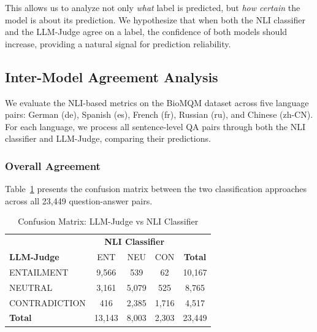     This allows us to analyze not only \textit{what} label is predicted, but \textit{how certain} the model is about its prediction. We hypothesize that when both the NLI classifier and the LLM-Judge agree on a label, the confidence of both models should increase, providing a natural signal for prediction reliability.



    \subsection{Inter-Model Agreement Analysis}
    \label{sec:nli_results}

    We evaluate the NLI-based metrics on the BioMQM dataset across five language pairs: German (de), Spanish (es), French (fr), Russian (ru), and Chinese (zh-CN). For each language, we process all sentence-level QA pairs through both the NLI classifier and LLM-Judge, comparing their predictions.

    \subsubsection{Overall Agreement}

    Table~\ref{tab:confusion_matrix} presents the confusion matrix between the two classification approaches across all 23,449 question-answer pairs.

    \begin{table}[htbp]
    \centering
    \caption{Confusion Matrix: LLM-Judge vs NLI Classifier}
    \label{tab:confusion_matrix}
    \begin{tabular}{l|ccc|c}
    \hline
    & \multicolumn{3}{c|}{\textbf{NLI Classifier}} & \\
    \textbf{LLM-Judge} & ENT & NEU & CON & \textbf{Total} \\
    \hline
    ENTAILMENT & 9,566 & 539 & 62 & 10,167 \\
    NEUTRAL & 3,161 & 5,079 & 525 & 8,765 \\
    CONTRADICTION & 416 & 2,385 & 1,716 & 4,517 \\
    \hline
    \textbf{Total} & 13,143 & 8,003 & 2,303 & 23,449 \\
    \hline
    \end{tabular}
    \end{table}

